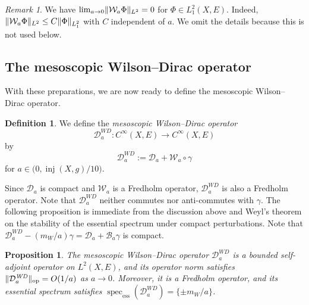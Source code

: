 \documentclass[a4paper,oneside,12pt]{amsart}
\theoremstyle{plain}
\newtheorem{proposition}[theorem]{Proposition}
\theoremstyle{definition}
\newtheorem{definition}[theorem]{Definition}
\theoremstyle{remark}
\newtheorem{remark}[theorem]{Remark}
\DeclarePairedDelimiter{\norm}{\lVert}{\rVert}
\newcommand{\essentialspectrum}{\operatorname{spec}_{\mathrm{ess}}}
\DeclareMathOperator{\injectivityradius}{inj}
\newcommand{\Ltwonorm}[2][L^2]{\norm{#2}_{#1}}
\DeclarePairedDelimiter{\operatornorm}{\lVert}{\rVert_{\mathrm{op}}}
\newcommand{\mesoscopicDiracoperator}[1][a]{\mathcal{D}_{#1}}
\newcommand{\mesoscopicWilsonterm}[1][a]{\mathcal{W}_{#1}}
\newcommand{\mesoscopicWilsonDiracoperator}[1][a]{\mathcal{D}_{#1}^{\mathit{WD}}}
\newcommand{\mesoscopicWilsontermcompactpert}[1][a]{\mathcal{B}_{#1}}
\begin{document}
\begin{remark}
  We have $\lim_{a \to 0} \Ltwonorm{\mesoscopicWilsonterm\Phi} = 0$ for $\Phi \in L^2_1(X,E)$.
  Indeed, $\Ltwonorm{\mesoscopicWilsonterm\Phi} \le C \norm{\Phi}_{L^2_1}$ with $C$ independent of $a$.
  We omit the details because this is not used below.
\end{remark}

\subsection{The mesoscopic Wilson--Dirac operator}

With these preparations, we are now ready to define the mesoscopic Wilson--Dirac operator.
\begin{definition}\label{definition: mesoscopic Wilson--Dirac operator}
  We define the \emph{mesoscopic Wilson--Dirac operator}
  \begin{equation}
    \mesoscopicWilsonDiracoperator \colon C^{\infty}(X,E) \to C^{\infty}(X,E)
  \end{equation}
  by
  \begin{equation}
    \mesoscopicWilsonDiracoperator := \mesoscopicDiracoperator + \mesoscopicWilsonterm \circ \gamma
  \end{equation}
  for $a \in \big(0,\injectivityradius(X,g)/10\big)$.
\end{definition}

Since $\mesoscopicDiracoperator$ is compact and $\mesoscopicWilsonterm$ is a Fredholm operator, $\mesoscopicWilsonDiracoperator$ is also a Fredholm operator.
Note that $\mesoscopicWilsonDiracoperator$ neither commutes nor anti-commutes with $\gamma$.
The following proposition is immediate from the discussion above and Weyl's theorem on the stability of the essential spectrum under compact perturbations.
Note that $\mesoscopicWilsonDiracoperator - (m_W/a)\gamma = \mesoscopicDiracoperator + \mesoscopicWilsontermcompactpert \gamma$ is compact.
\begin{proposition}\label{proposition: mesoscopic WD is bounded self-adjoint}
  The mesoscopic Wilson--Dirac operator $\mesoscopicWilsonDiracoperator$ is a bounded self-adjoint operator on $L^2(X,E)$, and its operator norm satisfies $\operatornorm{\mesoscopicWilsonDiracoperator} = O(1/a)$ as $a \to 0$.
  Moreover, it is a Fredholm operator, and its essential spectrum satisfies $\essentialspectrum(\mesoscopicWilsonDiracoperator) = \{ \pm m_W/a \}$.
\end{proposition}
\end{document}
